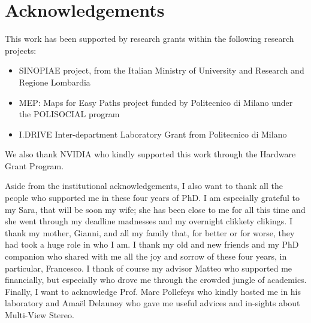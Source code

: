  \chapter*{Acknowledgements}
 
 This work has been supported by research grants within the following research projects:
\begin{itemize}
 \item[] SINOPIAE project, from the Italian Ministry of University and Research and Regione Lombardia
 \item[] MEP: Maps for Easy Paths project funded by Politecnico di Milano under the POLISOCIAL program
 \item[] I.DRIVE Inter-department Laboratory Grant from Politecnico di Milano
\end{itemize}
We also thank NVIDIA who kindly supported this work through the Hardware Grant Program.


\bigskip 



Aside from the institutional acknowledgements, I also want to thank all the people who supported me in these four years of PhD. 
I am especially grateful to my Sara, that will be soon my wife; she has been close to me for all this time and she went through my deadline madnesses and my overnight clikkety clikings.
I thank my mother,  Gianni, and all my family that, for better or for worse, they had took a huge role in who I am.
I thank my old and new friends and my PhD companion who shared with me all the joy and sorrow of these four years, in particular, Francesco.  
I thank of course my advisor Matteo who supported me financially, but especially who drove me through the crowded jungle of academics.
Finally, I want to acknowledge Prof. Marc Pollefeys who kindly hosted me in his laboratory and Amaël Delaunoy who gave me useful advices and in-sights about Multi-View Stereo.

